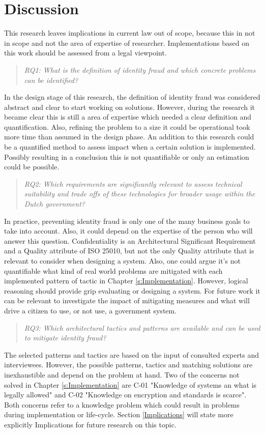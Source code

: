 \chapter{Discussion}\label{s:discussion}
This research leaves implications in current law out of scope, because this in not in scope and not the area of expertise of researcher. Implementations based on this work should be assessed from a legal viewpoint.

\begin{quote}\emph{RQ1: What is the definition of identity fraud and which concrete problems can be identified?}\end{quote}
In the design stage of this research, the definition of identity fraud was considered abstract and clear to start working on solutions. However, during the research it became clear this is still a area of expertise which needed a clear definition and quantification. Also, refining the problem to a size it could be operational took more time than assumed in the design phase. An addition to this research could be a quantified method to assess impact when a certain solution is implemented. Possibly resulting in a conclusion this is not quantifiable or only an estimation could be possible.

\begin{quote}\emph{RQ2: Which requirements are significantly relevant to assess technical suitability and trade offs of these technologies for broader usage within the Dutch government?}\end{quote}
In practice, preventing identity fraud is only one of the many business goals to take into account. Also, it could depend on the expertise of the person who will answer this question. Confidentiality is an Architectural Significant Requirement and a Quality attribute of ISO 25010, but not the only Quality attribute that is relevant to consider when designing a system. Also, one could argue it's not quantifiable what kind of real world problems are mitigated with each implemented pattern of tactic in Chapter \ref{s:Implementation}. However, logical reasoning should provide grip evaluating or designing a system. For future work it can be relevant to investigate the impact of mitigating measures and what will drive a citizen to use, or not use, a government system.

\begin{quote}\emph{RQ3: Which architectural tactics and patterns are available and can be used to mitigate identity fraud?}\end{quote}
The selected patterns and tactics are based on the input of consulted experts and interviewees. However, the possible patterns, tactics and matching solutions are inexhaustible and depend on the problem at hand. Two of the concerns not solved in Chapter \ref{s:Implementation} are C-01 "Knowledge of systems an what is legally allowed" and C-02 "Knowledge on encryption and standards is scarce". Both concerns refer to a knowledge problem which could result in problems during implementation or life-cycle. Section \ref{Implications} will state more explicitly  Implications for future research on this topic.

